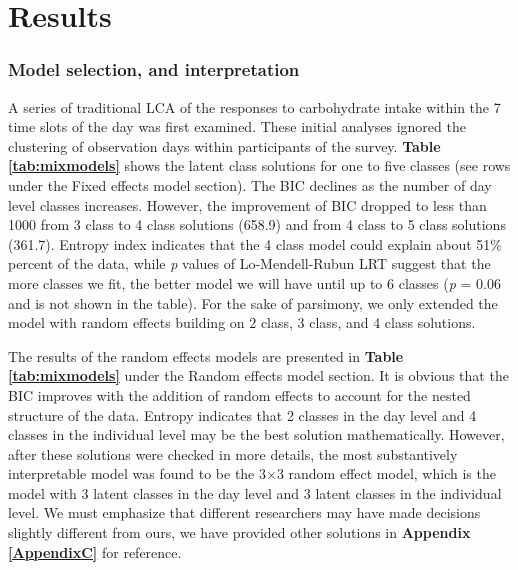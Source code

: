 
\chapter{Results} %

\label{Chapter 3} %


\vspace{-0.7cm}


\subsection{Model selection, and interpretation}\vspace{-0.4cm}

A series of traditional LCA of the responses to carbohydrate intake within the 7 time slots of the day was first examined. These initial analyses ignored the clustering of observation days within participants of the survey. \textbf{Table \ref{tab:mixmodels}} shows the latent class solutions for one to five classes (see rows under the Fixed effects model section). The BIC declines as the number of day level classes increases. However, the improvement of BIC dropped to less than 1000 from 3 class to 4 class solutions (658.9) and from 4 class to 5 class solutions (361.7). Entropy index indicates that the 4 class model could explain about 51\% percent of the data, while \textit{p} values of Lo-Mendell-Rubun LRT suggest that the more classes we fit, the better model we will have until up to 6 classes (\textit{p} = 0.06 and is not shown in the table). For the sake of parsimony, we only extended the model with random effects building on 2 class, 3 class, and 4 class solutions. 

The results of the random effects models are presented in \textbf{Table \ref{tab:mixmodels}} under the Random effects model section. It is obvious that the BIC improves with the addition of random effects to account for the nested structure of the data. Entropy indicates that 2 classes in the day level and 4 classes in the individual level may be the best solution mathematically. However, after these solutions were checked in more details, the most substantively interpretable model was found to be the 3$\times$3 random effect model, which is the model with 3 latent classes in the day level and 3 latent classes in the individual level. We must emphasize that different researchers may have made decisions slightly different from ours, we have provided other solutions in \textbf{Appendix \ref{AppendixC}} for reference. 

